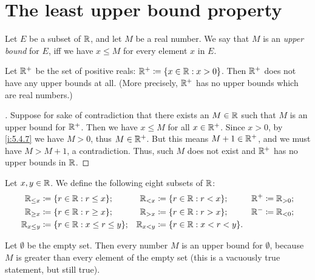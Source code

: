 \section{The least upper bound property}\label{i:sec:5.5}

\begin{defn}\label{i:5.5.1}
  Let \(E\) be a subset of \(\mathbb{R}\), and let \(M\) be a real number.
  We say that \(M\) is an \emph{upper bound} for \(E\), iff we have \(x \leq M\) for every element \(x\) in \(E\).
\end{defn}

\setcounter{thm}{2}
\begin{eg}\label{i:5.5.3}
  Let \(\mathbb{R}^+\) be the set of positive reals: \(\mathbb{R}^+ \coloneqq \left\lbrace x \in \mathbb{R} : x > 0\right\rbrace\).
  Then \(\mathbb{R}^+\) does not have any upper bounds at all.
  (More precisely, \(\mathbb{R}^+\) has no upper bounds which are real numbers.)
\end{eg}

\begin{proof}[]
  Suppose for sake of contradiction that there exists an \(M \in \mathbb{R}\) such that \(M\) is an upper bound for \(\mathbb{R}^+\).
  Then we have \(x \leq M\) for all \(x \in \mathbb{R}^+\).
  Since \(x > 0\), by \cref{i:5.4.7} we have \(M > 0\), thus \(M \in \mathbb{R}^+\).
  But this means \(M + 1 \in \mathbb{R}^+\), and we must have \(M > M + 1\), a contradiction.
  Thus, such \(M\) does not exist and \(\mathbb{R}^+\) has no upper bounds in \(\mathbb{R}\).
\end{proof}

\begin{ac}\label{i:ac:5.5.1}
  Let \(x, y \in \mathbb{R}\).
  We define the following eight subsets of \(\mathbb{R}\):
  \begin{align*}
    \R_{\leq x}   & \coloneqq \set{r \in \R : r \leq x};        & \R_{< x}   & \coloneqq \set{r \in \R : r < x};     & \R^+ & \coloneqq \R_{> 0}; \\
    \R_{\geq x}   & \coloneqq \set{r \in \R : r \geq x};        & \R_{> x}   & \coloneqq \set{r \in \R : r > x};     & \R^- & \coloneqq \R_{< 0}; \\
    \R_{x \leq y} & \coloneqq \set{r \in \R : x \leq r \leq y}; & \R_{x < y} & \coloneqq \set{r \in \R : x < r < y}. &      &
  \end{align*}
\end{ac}

\begin{eg}\label{i:5.5.4}
  Let \(\emptyset\) be the empty set.
  Then every number \(M\) is an upper bound for \(\emptyset\), because \(M\) is greater than every element of the empty set
  (this is a vacuously true statement, but still true).
\end{eg}

